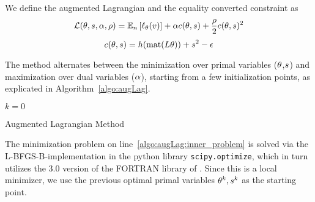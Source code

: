 We define the augmented Lagrangian and the equality converted constraint as
\begin{align}
     \label{eq:def:augLag}
     \mathcal L(\theta,s,\alpha, \rho) = \mathbb{E}_n \left[ \ell_\theta(v)\right] + \alpha c(\theta, s) + \frac{\rho}{2}c(\theta, s)^2
\end{align}
\[c(\theta, s) = h(\operatorname*{mat}(L\theta))+s^2-\epsilon \]

The method alternates between the minimization over primal variables ($\theta$,$s$) and maximization over dual variables ($\alpha$), starting from a few initialization points, as explicated in  Algorithm~\ref{algo:augLag}.

\begin{algorithm}[ht!]
     \DontPrintSemicolon
     \KwOut{$\mEstParameterEstN$ }
     $k=0$\;
     \nl{}
     \;
     \caption{Augmented Lagrangian Method}
     \label{algo:augLag}
\end{algorithm}

The minimization problem on line~\ref{algo:augLag:inner_problem} is solved via the L-BFGS-B-implementation in the python library \texttt{scipy.optimize}, which in turn utilizes the 3.0 version of the FORTRAN library of \citet{zhu_algorithm_1997}. Since this is a local minimizer, we use the previous optimal primal variables $\theta^{k},s^{k}$ as the starting point.

